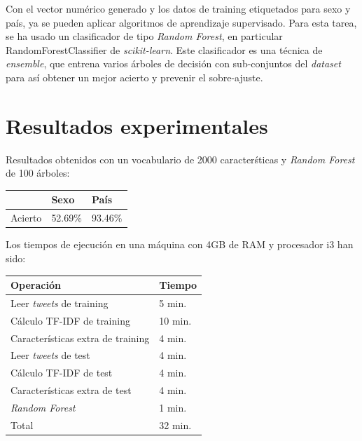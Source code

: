 \documentclass[11pt,a4paper]{article}
\begin{document}
  \indent Con el vector num\'erico generado y los datos de training etiquetados para sexo y pa\'is, ya se pueden aplicar algoritmos de aprendizaje supervisado. Para esta tarea, se ha usado un clasificador de tipo {\em Random Forest}, en particular {\ttfamily RandomForestClassifier} de {\em scikit-learn}. Este clasificador es una t\'ecnica de {\em ensemble}, que entrena varios \'arboles de decisi\'on con sub-conjuntos del {\em dataset} para as\'i obtener un mejor acierto y prevenir el sobre-ajuste.


\section{Resultados experimentales}

  \indent Resultados obtenidos con un vocabulario de 2000 caracter\'sticas y {\em Random Forest} de 100 \'arboles:
    \begin{center}
	\begin{tabular}{ l | l | l }
	  & Sexo  & Pa\'is\\ \hline
	  Acierto & 52.69\% & 93.46\% \\
	  \hline 
	\end{tabular}
    \end{center}
    
  \indent Los tiempos de ejecuci\'on en una m\'aquina con 4GB de RAM y procesador i3 han sido:
    \begin{center}
	\begin{tabular}{ l | l }
	  Operaci\'on & Tiempo\\ \hline
	  Leer {\em tweets} de training & 5 min. \\
	  C\'alculo TF-IDF de training & 10 min. \\
	  Caracter\'isticas extra de training & 4 min. \\
	  Leer {\em tweets} de test & 4 min. \\
	  C\'alculo TF-IDF de test & 4 min. \\
	  Caracter\'isticas extra de test & 4 min. \\
	  {\em Random Forest} & 1 min. \\ \hline
	  Total & 32 min.
	\end{tabular}
    \end{center}
  
\end{document}
